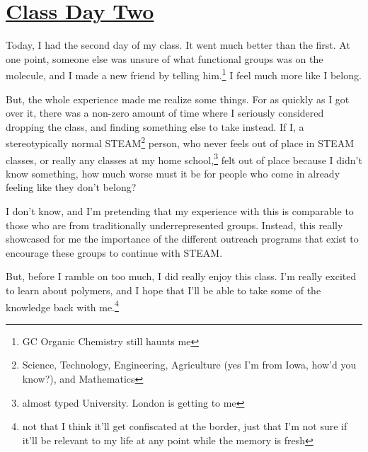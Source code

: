 \documentclass[12pt]{article}[titlepage]
\newcommand{\1}{\={a}}
\newcommand{\2}{\={e}}
\newcommand{\3}{\={\i}}
\newcommand{\4}{\=o}
\newcommand{\5}{\=u}
\newcommand{\6}{\={A}}
\renewcommand{\,}{\textsuperscript{,}}
\begin{document}
\doublespacing
\section{\href{class-day-ii.html}{Class Day Two}}
Today, I had the second day of my class.
It went much better than the first.
At one point, someone else was unsure of what functional groups was on the molecule, and I made a new friend by telling him.\footnote{GC Organic Chemistry still haunts me}
I feel much more like I belong.

But, the whole experience made me realize some things.
For as quickly as I got over it, there was a non-zero amount of time where I seriously considered dropping the class, and finding something else to take instead.
If I, a stereotypically normal STEAM\footnote{Science, Technology, Engineering, Agriculture (yes I'm from Iowa, how'd you know?), and Mathematics} person, who never feels out of place in STEAM classes, or really any classes at my home school,\footnote{almost typed University. London is getting to me} felt out of place because I didn't know something, how much worse must it be for people who come in already feeling like they don't belong?

I don't know, and I'm pretending that my experience with this is comparable to those who are from traditionally underrepresented groups.
Instead, this really showcased for me the importance of the different outreach programs that exist to encourage these groups to continue with STEAM.

But, before I ramble on too much, I did really enjoy this class.
I'm really excited to learn about polymers, and I hope that I'll be able to take some of the knowledge back with me.\footnote{not that I think it'll get confiscated at the border, just that I'm not sure if it'll be relevant to my life at any point while the memory is fresh}
\end{document}
